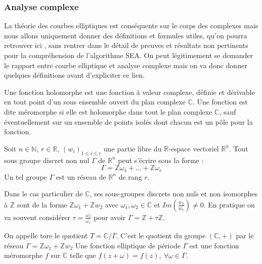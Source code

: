 \documentclass[12pt]{article}
\begin{document}
\subsubsection{Analyse complexe}
La théorie des courbes elliptiques est conséquente sur le corps des complexes mais nous allons uniquement donner des définitions et formules utiles, qu'on pourra retrouver ici \cite{complexbook} \cite{csi}, sans rentrer dans le détail de preuves et résultats non pertinents pour la compréhension de l'algorithme SEA. On peut légitimement se demander le rapport entre courbe elliptique et analyse complexe mais on va donc donner quelques définitions avant d'expliciter ce lien.

\begin{defi}
Une fonction holomorphe est une fonction à valeur complexe, définie et dérivable en tout point d'un sous ensemble ouvert du plan complexe $\mathbb{C}$. Une fonction est dite méromorphe si elle est holomorphe dans tout le plan complexe $\mathbb{C}$, sauf éventuellement sur un ensemble de points isolés dont chacun est un pôle pour la fonction.
\end{defi}

\begin{prop}
Soit $n \in \mathbb{N}$, $r \in \mathbb{R}$, $(w_i)_{1 \leq i \leq r}$ une partie libre du $\mathbb{R}$-espace vectoriel $\mathbb{R}^n$. Tout sous groupe discret non nul $\Gamma$ de $\mathbb{R}^n$ peut s'écrire sous la forme :
\begin{equation*}
\Gamma = \mathbb{Z} \omega_1 + \ldots + \mathbb{Z} \omega_r
\end{equation*}
Un tel groupe $\Gamma$ est un réseau de $\mathbb{R}^n$ de rang $r$.
\end{prop}
Dans le cas particulier de $\mathbb{C}$, ses sous-groupes discrets non nuls et non isomorphes à $\mathbb{Z}$ sont de la forme $\mathbb{Z}\omega_1 + \mathbb{Z}w_2$ avec $\omega_1, \omega_2 \in \mathbb{C}$ et $Im(\frac{w_2}{w_1}) \ne 0$. En pratique on va souvent considérer $\tau = \frac{\omega_2}{\omega_1}$ pour avoir $\Gamma = \mathbb{Z} + \tau \mathbb{Z}$.

\begin{defi}
On appelle tore le quotient $T = \mathbb{C}/ \Gamma$. C'est le quotient du groupe $(\mathbb{C}, +)$ par le réseau $\Gamma = \mathbb{Z}\omega_1 + \mathbb{Z}w_2$
\newline
Une fonction elliptique de période $\Gamma$ est une fonction méromorphe $f$ sur $\mathbb{C}$ telle que $f(z + \omega) = f(z) ,\ \forall \omega \in \Gamma$.
\end{defi}
\end{document}
